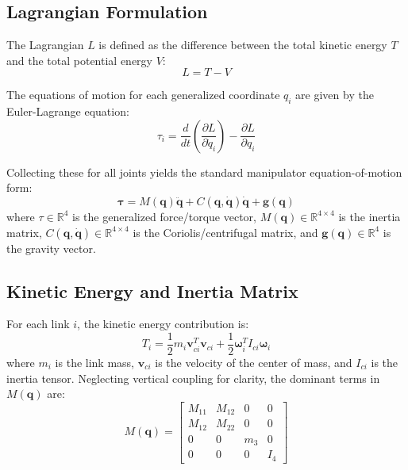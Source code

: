 \documentclass{article}
\begin{document}
\subsection{Lagrangian Formulation}
The Lagrangian $L$ is defined as the difference between the total kinetic energy $T$ and the total potential energy $V$:
\begin{equation}
L = T - V \tag{7.1}
\end{equation}

The equations of motion for each generalized coordinate $q_i$ are given by the Euler-Lagrange equation:
\begin{equation}
\tau_i = \frac{d}{dt} \left( \frac{\partial L}{\partial \dot{q}_i} \right) - \frac{\partial L}{\partial q_i} \tag{7.2}
\end{equation}

Collecting these for all joints yields the standard manipulator equation-of-motion form:
\begin{equation}
\mathbf{\tau} = M(\mathbf{q})\ddot{\mathbf{q}} + C(\mathbf{q}, \dot{\mathbf{q}})\dot{\mathbf{q}} + \mathbf{g}(\mathbf{q}) \tag{7.3}
\end{equation}
where $\tau \in \mathbb{R}^4$ is the generalized force/torque vector, $M(\mathbf{q}) \in \mathbb{R}^{4 \times 4}$ is the inertia matrix, $C(\mathbf{q}, \dot{\mathbf{q}}) \in \mathbb{R}^{4 \times 4}$ is the Coriolis/centrifugal matrix, and $\mathbf{g}(\mathbf{q}) \in \mathbb{R}^4$ is the gravity vector.

\subsection{Kinetic Energy and Inertia Matrix}
For each link $i$, the kinetic energy contribution is:
\begin{equation}
T_i = \frac{1}{2}m_i \mathbf{v}_{ci}^T \mathbf{v}_{ci} + \frac{1}{2}\mathbf{\omega}_i^T I_{ci} \mathbf{\omega}_i \tag{7.4}
\end{equation}
where $m_i$ is the link mass, $\mathbf{v}_{ci}$ is the velocity of the center of mass, and $I_{ci}$ is the inertia tensor. Neglecting vertical coupling for clarity, the dominant terms in $M(\mathbf{q})$ are:
\begin{equation}
M(\mathbf{q}) = \begin{bmatrix}
M_{11} & M_{12} & 0 & 0 \\
M_{12} & M_{22} & 0 & 0 \\
0 & 0 & m_3 & 0 \\
0 & 0 & 0 & I_4
\end{bmatrix} \tag{7.5}
\end{equation}
\end{document}
